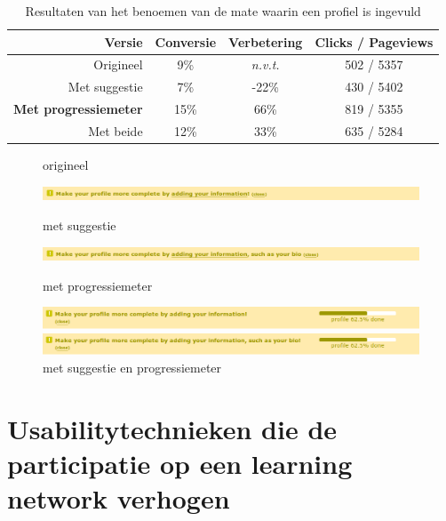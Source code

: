 \documentclass[a4paper, 10pt, pdftex]{report}
\begin{document}
        \begin{table}[ht]
        \centering
        \caption{Resultaten van het benoemen van de mate waarin een profiel is ingevuld}
        \begin{tabular}{r|*{3}{c}}
          \textbf{Versie}                   & Conversie  & Verbetering   & Clicks / Pageviews \\ \hline
          Origineel                         & 9\%        & \emph{n.v.t.} & 502 / 5357 \\
          Met suggestie                     & 7\%        & -22\%         & 430 / 5402\\
          \textbf{Met progressiemeter}      & 15\%       & 66\%          & 819 / 5355\\
          Met beide  & 12\%       & 33\%          & 635 / 5284\\
        \end{tabular}
        \label{tab:profilecta}
        \end{table}

    \begin{figure}
      \caption{origineel}
      \includegraphics[width=\textwidth]{../images/abtest/original}

      \caption{met suggestie}
      \includegraphics[width=\textwidth]{../images/abtest/suggestion}

      \caption{met progressiemeter}
      \includegraphics[width=\textwidth]{../images/abtest/progresbar}

      \caption{met suggestie en progressiemeter}
      \includegraphics[width=\textwidth]{../images/abtest/both}
    \end{figure}

  \newpage
  \chapter{Usabilitytechnieken die de participatie op een learning network verhogen}
\end{document}
